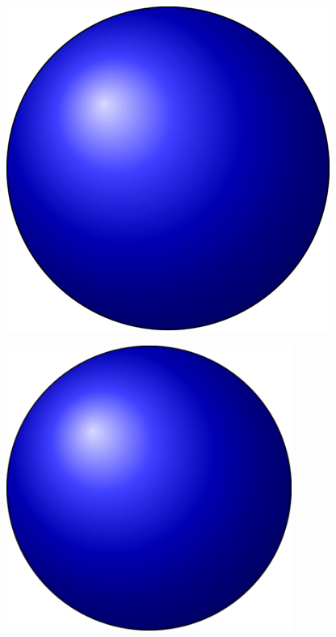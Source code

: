 \documentclass{article}
\begin{document}
\includegraphics{img/bola}  %

\includegraphics[width=0.7\textwidth]{img/bola} %
\end{document}
